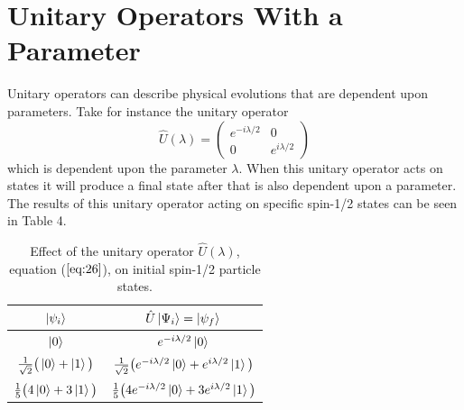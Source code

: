 \documentclass[twocolumn]{article}
\begin{document}
\section*{Unitary Operators With a Parameter}
Unitary operators can describe physical evolutions that are dependent upon parameters. Take for instance the unitary operator
\begin{equation}\label{eq:26}
\hat{U}(\lambda)=
\begin{pmatrix}
e^{-i\lambda/2} & 0 \\
0 & e^{i\lambda/2}
\end{pmatrix}
\end{equation}
which is dependent upon the parameter $\lambda$. When this unitary operator acts on states it will produce a final state after that is also dependent upon a parameter. The results of this unitary operator acting on specific spin-1/2 states can be seen in Table 4.
\newpage
\begin{table}[h!]
\begin{center}
\begin{tabular}{ |c|c| }
\hline $\ket{\psi_i}$& $\hat{U}\ket{\Psi_i}=\ket{\psi_f}$ \\
\hline $\ket{0}$& $e^{-i\lambda/2}\ket{0}$\\
\hline $\frac{1}{\sqrt{2}}\big(\ket{0}+\ket{1}\big)$& $\frac{1}{\sqrt{2}}\big(e^{-i\lambda/2}\ket{0}+e^{i\lambda/2}\ket{1}\big)$\\
\hline $\frac{1}{5}\big(4\ket{0}+3\ket{1}\big)$& $\frac{1}{5}\big(4e^{-i\lambda/2}\ket{0}+3e^{i\lambda/2}\ket{1}\big)$\\
\hline
\end{tabular}
\caption{Effect of the unitary operator $\hat{U}(\lambda)$, equation ($\ref{eq:26}$), on initial spin-1/2 particle states.}
\end{center}
\end{table} 
\end{document}

